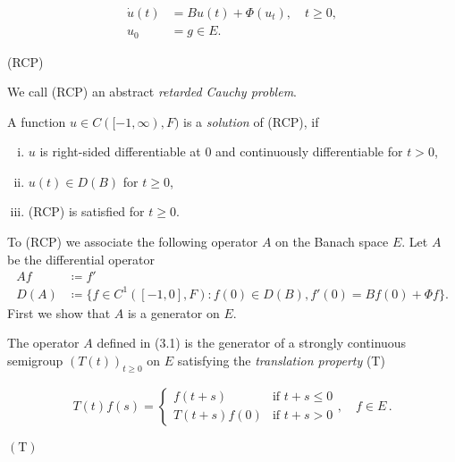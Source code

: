 \begin{minipage}{0.9\textwidth}
\begin{equation*}
	\begin{aligned}
		\dot{u}(t) &= Bu(t) + \Phi(u_{t}), \quad t \geq 0, \\
		u_{0} &= g \in E.
	\end{aligned}
\end{equation*}
\end{minipage}
\hfill
\begin{minipage}{0.05\textwidth}
(RCP)
\end{minipage}
%
%
\newpage
We call (RCP) an abstract \emph{retarded Cauchy problem}.

A function $u \in C([-1,\infty),F)$ is a \emph{solution} of (RCP), if
\begin{enumerate}[(i)]
	\item 
	$u$ is right-sided differentiable at 0 and continuously differentiable for $t  >  0$,
	
	\item 
	$u(t) \in D(B)$ for $t \geq 0$,
	\item 
	(RCP) is satisfied for $t \geq 0$.
\end{enumerate}

To (RCP) we associate the following operator $A$ on the Banach space $E$.
Let $A$ be the differential operator
\begin{equation}\label{eq:b4-3.1}
	\begin{aligned}
		Af & \coloneq  f' \\
		D(A) & \coloneq  \{f \in C^1([-1,0],F) \colon f(0) \in D(B), f'(0) = Bf(0) + \Phi f\}.
	\end{aligned}
\end{equation}
First we show that $A$ is a generator on $E$.
\begin{theorem}\label{thm:b4-3.1}
	The operator $A$ defined in (3.1) is the generator of a strongly continuous semigroup $(T(t))_{t\geq 0}$ on $E$ satisfying the \emph{translation property} (T)

\begin{minipage}{0.9\textwidth}
	\begin{equation*}
		\begin{aligned}
			T(t)f(s) = \begin{cases} 
				f(t+s) & \text{if } t+s \leq 0 \\
				T(t+s)f(0) & \text{if } t+s  >  0 
			\end{cases}, \quad f \in E\,.
		\end{aligned}
	\end{equation*}
\end{minipage}
\hfill
\begin{minipage}{0.05\textwidth}
	$\mathrm{(T)}$
\end{minipage}
%
\end{theorem}


